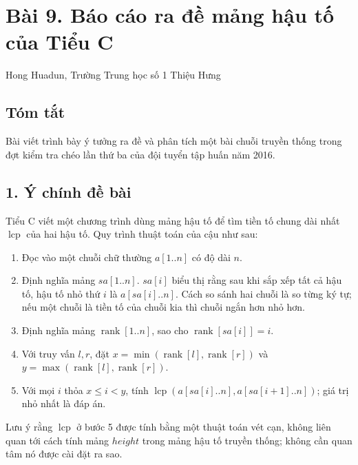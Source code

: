 \documentclass[11pt]{article}
\begin{document}
\section*{Bài 9. Báo cáo ra đề mảng hậu tố của Tiểu C}

\begin{center}
Hong Huadun, Trường Trung học số 1 Thiệu Hưng
\end{center}

\subsection*{Tóm tắt}

Bài viết trình bày ý tưởng ra đề và phân tích một bài chuỗi truyền thống trong
đợt kiểm tra chéo lần thứ ba của đội tuyển tập huấn năm 2016.

\subsection*{1. Ý chính đề bài}

Tiểu C viết một chương trình dùng mảng hậu tố để tìm tiền tố chung dài nhất
\(\operatorname{lcp}\) của hai hậu tố. Quy trình thuật toán của cậu như sau:
\begin{enumerate}
  \item Đọc vào một chuỗi chữ thường \(a[1..n]\) có độ dài \(n\).
  \item Định nghĩa mảng \(sa[1..n]\). \(sa[i]\) biểu thị rằng sau khi sắp xếp
  tất cả hậu tố, hậu tố nhỏ thứ \(i\) là \(a[sa[i]..n]\). Cách so sánh hai
  chuỗi là so từng ký tự; nếu một chuỗi là tiền tố của chuỗi kia thì chuỗi
  ngắn hơn nhỏ hơn.
  \item Định nghĩa mảng \(\operatorname{rank}[1..n]\), sao cho
  \(\operatorname{rank}[sa[i]]=i\).
  \item Với truy vấn \(l,r\), đặt
  \(x=\min(\operatorname{rank}[l],\operatorname{rank}[r])\) và
  \(y=\max(\operatorname{rank}[l],\operatorname{rank}[r])\).
  \item Với mọi \(i\) thỏa \(x\le i<y\), tính
  \(\operatorname{lcp}(a[sa[i]..n],a[sa[i+1]..n])\); giá trị nhỏ nhất là đáp
  án.
\end{enumerate}

Lưu ý rằng \(\operatorname{lcp}\) ở bước 5 được tính bằng một thuật toán vét
cạn, không liên quan tới cách tính mảng \(height\) trong mảng hậu tố truyền
thống; không cần quan tâm nó được cài đặt ra sao.
\end{document}
